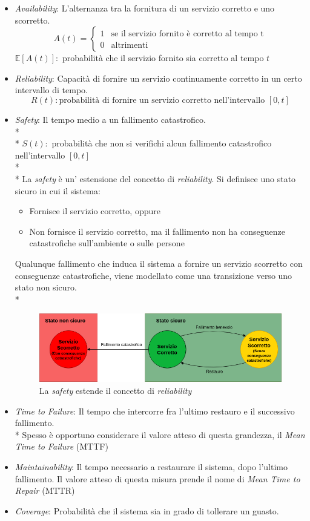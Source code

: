 \begin{itemize}
	\item \emph{Availability}: L'alternanza tra la fornitura di un servizio corretto e uno scorretto.
	$$
	A(t) = \begin{cases} 1 & \mbox{se il servizio fornito \`e corretto al tempo t} \\ 0 & \mbox{altrimenti} \end{cases}
	$$
	$\mathbb E[A(t)]:$ probabilit\`a che il servizio fornito sia corretto al tempo $t$
	\item \emph{Reliability}: Capacit\`a di fornire un servizio continuamente corretto in un certo intervallo di tempo.
	$$
	R(t):\mbox{probabilit\`a di fornire un servizio corretto nell'intervallo }[0,t]
	$$
	\item \emph{Safety}: Il tempo medio a un fallimento catastrofico.\\*\\*
	$S(t):$ probabilit\`a che non si verifichi alcun fallimento catastrofico nell'intervallo $[0,t]$\\*\\*
	La \emph{safety} \`e un' estensione del concetto di \emph{reliability}.\newpage
	Si definisce uno stato sicuro in cui il sistema:
	\begin{itemize}
		\item Fornisce il servizio corretto, oppure
		\item Non fornisce il servizio corretto, ma il fallimento non ha conseguenze catastrofiche sull'ambiente o sulle persone
	\end{itemize}
	Qualunque fallimento che induca il sistema a fornire un servizio scorretto con conseguenze catastrofiche, viene modellato come una transizione verso uno stato non sicuro.\\*
	\begin{figure}[h]
		\centering
		\includegraphics[width=0.7\linewidth]{img/safety}
		\caption{La \emph{safety} estende il concetto di \emph{reliability}}
		\label{fig:safety}
	\end{figure}
	\item \emph{Time to Failure}: Il tempo che intercorre fra l'ultimo restauro e il successivo fallimento.\\*
	Spesso \`e opportuno considerare il valore atteso di questa grandezza, il \emph{Mean Time to Failure} (MTTF)
	\item \emph{Maintainability}: Il tempo necessario a restaurare il sistema, dopo l'ultimo fallimento. Il valore atteso di questa misura prende il nome di \emph{Mean Time to Repair} (MTTR)
	\item \emph{Coverage}: Probabilit\`a che il sistema sia in grado di tollerare un guasto.
\end{itemize}
